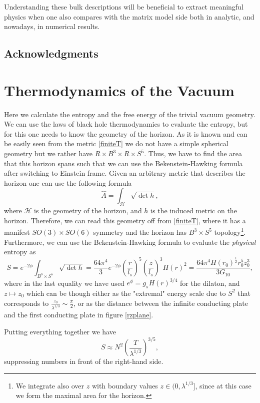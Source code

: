 \documentclass[11pt,english]{article}
\newcommand{\be}{\begin{equation}}
\newcommand{\ee}{\end{equation}}
\numberwithin{equation}{section}
\begin{document}
 
  Understanding these bulk descriptions will be beneficial to extract meaningful physics when one also compares with the matrix model side both in analytic, and nowadays,  in numerical results.      
  
 \subsection*{Acknowledgments}

  \appendix
  \section{Thermodynamics of the Vacuum}
  Here we calculate the entropy and the free energy of the trivial vacuum geometry. We can use the laws of black hole thermodynamics to evaluate the entropy, but for this one needs to know the geometry of the horizon. As it is known and can be easily seen from the metric \eqref{finiteT} we do not have a simple spherical geometry but we rather have $R\times B^3\times R \times S^5$. Thus, we have to find the area that this horizon spans such that we can use the Bekenstein-Hawking formula after switching to Einstein frame. Given an arbitrary metric that describes the horizon one can use the following formula
  \be \label{generalarea}
  \hat{A}=\int_\mathcal{H}\sqrt{\det{h}},
  \ee 
  where $\mathcal{H}$ is the geometry of the horizon, and $h$ is the induced metric on the horizon. Therefore, we can read this geometry off from \eqref{finiteT}, where it has a manifest $SO(3)\times SO(6)$ symmetry and the horizon has  $B^3\times S^5$  topology\footnote{We integrate also over $z$ with boundary values $z\in (0,\lambda^{1/3}]$, since at this case we form the maximal area for the horizon.}.  
  \noindent
  Furthermore, we can use the  Bekenstein-Hawking formula to evaluate the \textit{physical} entropy as
  \be 
  S=e^{-2\phi}\int_{B^3\times S^5}\sqrt{\det{h}}=\frac{64\pi^4 }{3}e^{-2\phi} \left(\frac{r}{l_s}\right)^5\left(\frac{z}{l_s}\right)^3H(r)^2=\frac{64\pi^4H(r_0)^{\frac{1}{2}}r_0^5z_0^3}{3G_{10}},
  \ee 
  where in the last equality we have used $e^\phi=g_sH(r)^{3/4}$ for the dilaton, and $z\mapsto z_0$ which can be though either as the "extremal" energy scale due to $S^2$ that corresponds to $\frac{z_0}{\lambda^{1/3}}\sim\frac{\pi}{2}$, or as the distance between the infinite conducting plate and the first conducting plate in figure \ref{rzplane}.  
  
  Putting everything together we have 
  \be \label{entropy}
  S\approx N^2\left(\frac{T}{\lambda^{1/3}}\right)^{3/5},
  \ee  
  suppressing numbers in front of the right-hand side. 
  
\end{document}
